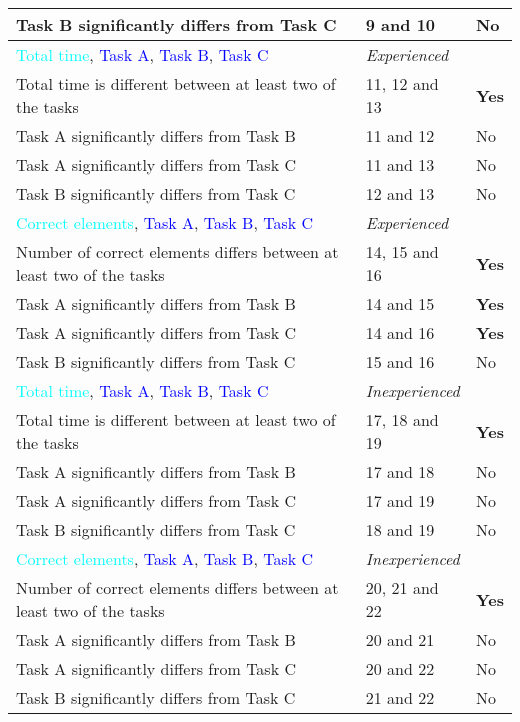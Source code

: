 \begin{longtable}{p{}|p{}|p{}}
		Task B significantly differs from Task C &  9 and 10 & No  \\ \hline
		\textcolor{cyan}{Total time}, \textcolor{blue}{Task A}, \textcolor{blue}{Task B}, \textcolor{blue}{Task C} & \textit{Experienced}  &  \\
		Total time is different between at least two of the tasks & 11, 12 and 13 & \textbf{Yes}  \\
		Task A significantly differs from Task B & 11 and 12  & No  \\ 
		Task A significantly differs from Task C & 11 and 13  & No  \\ 
		Task B significantly differs from Task C & 12 and 13 & No  \\ \hline
		\textcolor{cyan}{Correct elements}, \textcolor{blue}{Task A}, \textcolor{blue}{Task B}, \textcolor{blue}{Task C} & \textit{Experienced}  &  \\
		Number of correct elements differs between at least two of the tasks & 14, 15 and 16 & \textbf{Yes}  \\
		Task A significantly differs from Task B & 14 and 15 & \textbf{Yes}  \\ 
		Task A significantly differs from Task C & 14 and 16 & \textbf{Yes} \\ 
		Task B significantly differs from Task C & 15 and 16 & No  \\ \hline
		\textcolor{cyan}{Total time}, \textcolor{blue}{Task A}, \textcolor{blue}{Task B}, \textcolor{blue}{Task C} & \textit{Inexperienced}  &  \\
		Total time is different between at least two of the tasks & 17, 18 and 19 & \textbf{Yes}  \\
		Task A significantly differs from Task B & 17 and 18 & No  \\ 
		Task A significantly differs from Task C & 17 and 19 & No  \\ 
		Task B significantly differs from Task C & 18 and 19 & No  \\ \hline
		\textcolor{cyan}{Correct elements}, \textcolor{blue}{Task A}, \textcolor{blue}{Task B}, \textcolor{blue}{Task C} & \textit{Inexperienced}  &  \\
		Number of correct elements differs between at least two of the tasks & 20, 21 and 22 & \textbf{Yes}  \\
		Task A significantly differs from Task B & 20 and 21 & No  \\ 
		Task A significantly differs from Task C & 20 and 22 & No \\ 
		Task B significantly differs from Task C & 21 and 22 & No  \\ \hline
	\end{longtable}
